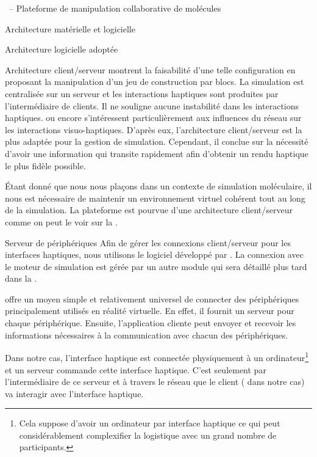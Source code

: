 \documentclass[myfrancais,ngerman,english,french]{mythesis}
\begin{document}
\begin{mychapter}{\myShaddock\ -- Plateforme de manipulation collaborative de molécules}
\begin{mysection}{Architecture matérielle et logicielle}
\begin{mysubsection}{Architecture logicielle adoptée}
\begin{mysubsubsection}{Architecture client/serveur}
					 montrent la faisabilité d'une telle configuration en proposant la manipulation d'un jeu de construction par blocs.
					La simulation est centralisée sur un serveur et les interactions haptiques sont produites par l'intermédiaire de clients.
					Il ne souligne aucune instabilité dans les interactions haptiques.
					 ou encore  s'intéressent particulièrement aux influences du réseau sur les interactions visuo-haptiques.
					D'après eux, l'architecture client/serveur est la plus adaptée pour la gestion de simulation.
					Cependant, il conclue sur la nécessité d'avoir une information qui transite rapidement afin d'obtenir un rendu haptique le plus fidèle possible.

					Étant donné que nous nous plaçons dans un contexte de simulation moléculaire, il nous est nécessaire de maintenir un environnement virtuel cohérent tout au long de la simulation.
					La plateforme \myShaddock est pourvue d'une architecture client/serveur comme on peut le voir sur la .
				\end{mysubsubsection}
				\begin{mysubsubsection}{Serveur de périphériques}
					Afin de gérer les connexions client/serveur pour les interfaces haptiques, nous utilisons le logiciel  développé par .
					La connexion avec le moteur de simulation est gérée par un autre module qui sera détaillé plus tard dans la .

					 offre un moyen simple et relativement universel de connecter des périphériques principalement utilisés en réalité virtuelle.
					En effet, il fournit un serveur pour chaque périphérique.
					Ensuite, l'application cliente peut envoyer et recevoir les informations nécessaires à la communication avec chacun des périphériques.

					Dans notre cas, l'interface haptique est connectée physiquement à un ordinateur\footnote{Cela suppose d'avoir un ordinateur par interface haptique ce qui peut considérablement complexifier la logistique avec un grand nombre de participants.} et un serveur  commande cette interface haptique.
					C'est seulement par l'intermédiaire de ce serveur  et à travers le réseau que le client ( dans notre cas) va interagir avec l'interface haptique.


\end{mysubsubsection}
\end{mysubsection}
\end{mysection}
\end{mychapter}
\end{document}
